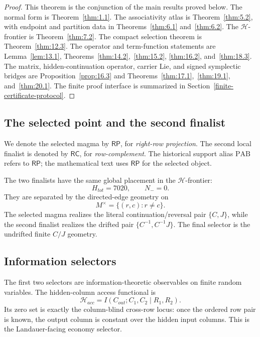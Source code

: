 \documentclass[11pt]{article}
\theoremstyle{definition}
\newcommand{\RP}{\mathsf{RP}}
\newcommand{\RC}{\mathsf{RC}}
\begin{document}
\begin{proof}
This theorem is the conjunction of the main results proved below.  The
normal form is Theorem~\ref{thm:1.1}.  The associativity atlas is
Theorem~\ref{thm:5.2}, with endpoint and partition data in
Theorems~\ref{thm:6.1} and~\ref{thm:6.2}.  The \(\mathcal H\)-frontier
is Theorem~\ref{thm:7.2}.  The compact selection theorem is
Theorem~\ref{thm:12.3}.  The operator and term-function statements are
Lemma~\ref{lem:13.1}, Theorems~\ref{thm:14.2},~\ref{thm:15.2},
\ref{thm:16.2}, and~\ref{thm:18.3}.  The matrix, hidden-continuation
operator, carrier Lie, and signed symplectic bridges are
Proposition~\ref{prop:16.3} and Theorems~\ref{thm:17.1},~\ref{thm:19.1},
and~\ref{thm:20.1}.  The finite proof interface is summarized in
Section~\ref{finite-certificate-protocol}.
\end{proof}

\subsection{The selected point and the second finalist}\label{selected-point-and-second-finalist}

We denote the selected magma by \(\RP\), for \emph{right-row projection}.
The second local finalist is denoted by \(\RC\), for \emph{row-complement}.
The historical support alias \(\mathrm{PAB}\) refers to \(\RP\); the
mathematical text uses \(\RP\) for the selected object.

The two finalists have the same global placement in the \(\mathcal H\)-frontier:
\[
H_{tot}=7020,
\qquad
N_-=0.
\]
They are separated by the directed-edge geometry on
\[
M^\times=\{(r,c):r\ne c\}.
\]
The selected magma realizes the literal continuation/reversal pair
\(\{C,J\}\), while the second finalist realizes the drifted pair
\(\{C^{-1},C^{-1}J\}\).  The final selector is the undrifted finite
\(C/J\) geometry.

\subsection{Information selectors}\label{information-selectors}

The first two selectors are information-theoretic observables on finite
random variables.  The hidden-column access functional is
\[
\mathcal H_{acc}=I(C_{out};C_1,C_2\mid R_1,R_2).
\]
Its zero set is exactly the column-blind cross-row locus: once the ordered
row pair is known, the output column is constant over the hidden input
columns.  This is the Landauer-facing economy selector.
\end{document}

